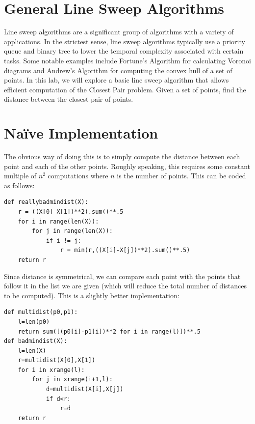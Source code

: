 \label{lab:Alg_Linesweep}


\section*{General Line Sweep Algorithms}

Line sweep algorithms are a significant group of algorithms with a variety of applications. 
In the strictest sense, line sweep algorithms typically use a priority queue and binary tree to lower the temporal complexity associated with certain tasks. 
Some notable examples include Fortune's Algorithm for calculating Voronoi diagrams and Andrew's Algorithm for computing the convex hull of a set of points. 
In this lab, we will explore a basic line sweep algorithm that allows efficient computation of the Closest Pair problem.  
Given a set of points, find the distance between the closest pair of points.

\section*{Na\"ive Implementation}

The obvious way of doing this is to simply compute the distance between each point and each of the other points.
Roughly speaking, this requires some constant multiple of $n^2$ computations where $n$ is the number of points.
This can be coded as follows:
\begin{lstlisting}
def reallybadmindist(X):
    r = ((X[0]-X[1])**2).sum()**.5
    for i in range(len(X)):
        for j in range(len(X)):
            if i != j:
                r = min(r,((X[i]-X[j])**2).sum()**.5)
    return r
\end{lstlisting}
Since distance is symmetrical, we can compare each point with the points that follow it in the list we are given (which will reduce
the total number of distances to be computed).
This is a slightly better implementation:
\begin{lstlisting}
def multidist(p0,p1):
    l=len(p0)
    return sum([(p0[i]-p1[i])**2 for i in range(l)])**.5
def badmindist(X):
    l=len(X)
    r=multidist(X[0],X[1])
    for i in xrange(l):
        for j in xrange(i+1,l):
            d=multidist(X[i],X[j])
            if d<r:
                r=d
    return r
\end{lstlisting}

